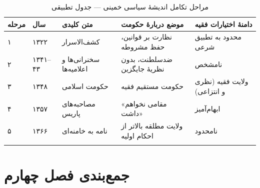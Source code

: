 \begin{longtable}{%
    >{\centering\arraybackslash}p{}
    >{\raggedleft\arraybackslash}p{}
    >{\raggedleft\arraybackslash}p{}
    >{\raggedleft\arraybackslash}p{}
    >{\raggedleft\arraybackslash}p{}}
\toprule
\rowcolor{cGold!15}
\textbf{مرحله} & \textbf{سال} & \textbf{متن کلیدی} & \textbf{موضع دربارهٔ حکومت} & \textbf{دامنهٔ اختیارات فقیه} \\
\midrule
\endhead

\cellcolor{cGreen!8} ۱ & \cellcolor{cGreen!8} ۱۳۲۲ & \cellcolor{cGreen!8} کشف‌الاسرار & \cellcolor{cGreen!8} نظارت بر قوانین، حفظ مشروطه & \cellcolor{cGreen!8} محدود به تطبیق شرعی \\
\midrule

\cellcolor{cGold!8} ۲ & \cellcolor{cGold!8} ۱۳۴۱–۴۳ & \cellcolor{cGold!8} سخنرانی‌ها و اعلامیه‌ها & \cellcolor{cGold!8} ضدسلطنت، بدون نظریهٔ جایگزین & \cellcolor{cGold!8} نامشخص \\
\midrule

\cellcolor{cWarn!8} ۳ & \cellcolor{cWarn!8} ۱۳۴۸ & \cellcolor{cWarn!8} حکومت اسلامی & \cellcolor{cWarn!8} حکومت مستقیم فقیه & \cellcolor{cWarn!8} ولایت فقیه (نظری و انتزاعی) \\
\midrule

\cellcolor{cPrimary!8} ۴ & \cellcolor{cPrimary!8} ۱۳۵۷ & \cellcolor{cPrimary!8} مصاحبه‌های پاریس & \cellcolor{cPrimary!8} «مقامی نخواهم داشت» & \cellcolor{cPrimary!8} ابهام‌آمیز \\
\midrule

\cellcolor{cAccent!8} ۵ & \cellcolor{cAccent!8} ۱۳۶۶ & \cellcolor{cAccent!8} نامه به خامنه‌ای & \cellcolor{cAccent!8} ولایت مطلقه بالاتر از احکام اولیه & \cellcolor{cAccent!8} نامحدود \\

\bottomrule
\caption{مراحل تکامل اندیشهٔ سیاسی خمینی — جدول تطبیقی}
\label{tab:evolution-stages}
\end{longtable}

\section{جمع‌بندی فصل چهارم}

